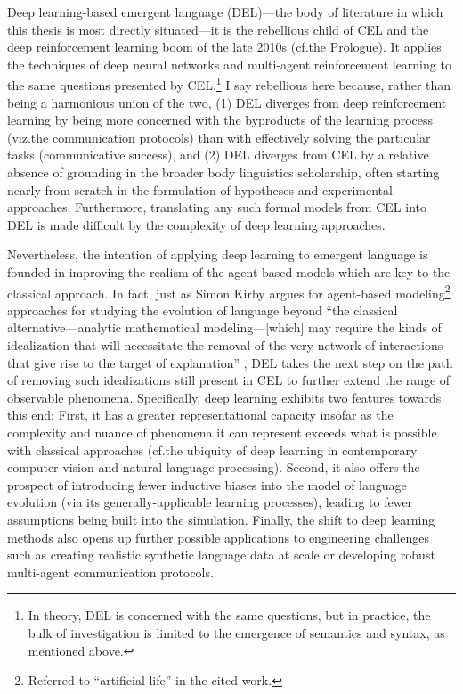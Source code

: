 Deep learning-based emergent language (DEL)---the body of literature in which this thesis is most directly situated---it is the rebellious child of CEL and the deep reinforcement learning boom of the late 2010s (cf.\@ \hyperref[ch:prologue]{the Prologue}).
It applies the techniques of deep neural networks and multi-agent reinforcement learning to the same questions presented by CEL.\footnote{In theory, DEL is concerned with the same questions, but in practice, the bulk of investigation is limited to the emergence of semantics and syntax, as mentioned above.}
I say rebellious here because, rather than being a harmonious union of the two,
  (1) DEL diverges from deep reinforcement learning by being more concerned with the byproducts of the learning process (viz.\@ the communication protocols) than with effectively solving the particular tasks (communicative success),
  and (2) DEL diverges from CEL by a relative absence of grounding in the broader body linguistics scholarship, often starting nearly from scratch in the formulation of hypotheses and experimental approaches.
    Furthermore, translating any such formal models from CEL into DEL is made difficult by the complexity of deep learning approaches.

Nevertheless, the intention of applying deep learning to emergent language is founded in improving the realism of the agent-based models which are key to the classical approach.
In fact,
  just as Simon Kirby argues for agent-based modeling\footnote{Referred to ``artificial life'' in the cited work.} approaches for studying the evolution of language beyond ``the classical alternative---analytic mathematical modeling---[which] may require the kinds of idealization that will necessitate the removal of the very network of interactions that give rise to the target of explanation'' \citep{kirby2002alife},
  DEL takes the next step on the path of removing such idealizations still present in CEL to further extend the range of observable phenomena.
Specifically, deep learning exhibits two features towards this end:
First, it has a greater representational capacity insofar as the complexity and nuance of phenomena it can represent exceeds what is possible with classical approaches (cf.\@ the ubiquity of deep learning in contemporary computer vision and natural language processing).
Second, it also offers the prospect of introducing fewer inductive biases into the model of language evolution (via its generally-applicable learning processes), leading to fewer assumptions being built into the simulation.
Finally, the shift to deep learning methods also opens up further possible applications to engineering challenges such as creating realistic synthetic language data at scale or developing robust multi-agent communication protocols.


